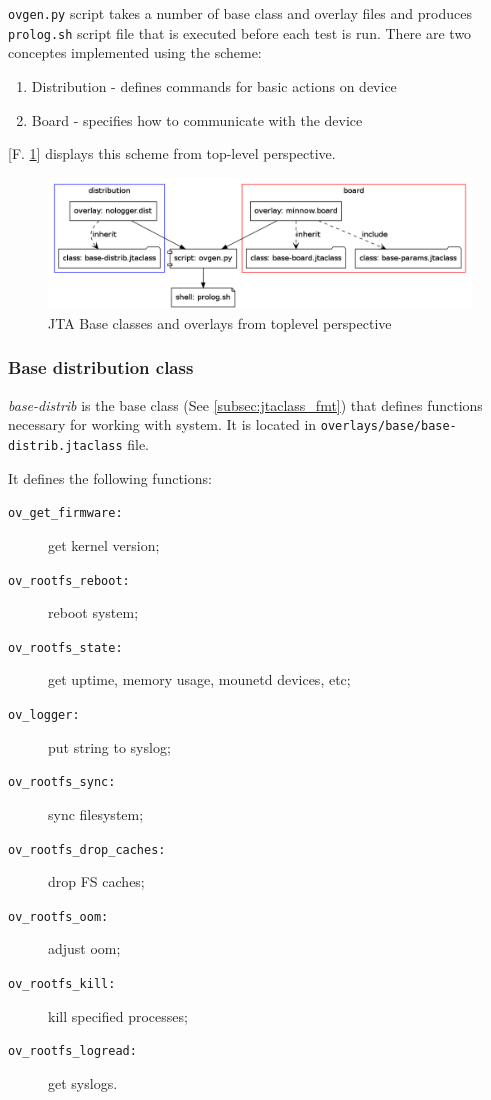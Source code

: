 \texttt{ovgen.py} script takes a number of base class and overlay files and produces \texttt{prolog.sh} script file that
is executed before each test is run.
There are two conceptes implemented using the scheme:
\begin{enumerate}
\item Distribution - defines commands for basic actions on device
\item Board - specifies how to communicate with the device
\end{enumerate}
[F. \ref{fig:base_ovs_toplevel}] displays this scheme from top-level perspective.
\begin{figure}[H]
  \includegraphics*[width=16cm]{overlays_toplevel.png}
  \caption{JTA Base classes and overlays from toplevel perspective}
  \label{fig:base_ovs_toplevel}
\end{figure}

\subsubsection{Base distribution class}
\textit{base-distrib} is the base class (See \ref{subsec:jtaclass_fmt}) that defines functions necessary for working with system. It is located in \texttt{overlays/base/base-distrib.jtaclass} file.

It defines the following functions:

\begin{description}
\item[\texttt{ov\_get\_firmware:}] get kernel version;
\item[\texttt{ov\_rootfs\_reboot:}] reboot system;
\item[\texttt{ov\_rootfs\_state:}] get uptime, memory usage, mounetd devices, etc;
\item[\texttt{ov\_logger:}] put string to syslog;
\item[\texttt{ov\_rootfs\_sync:}] sync filesystem;
\item[\texttt{ov\_rootfs\_drop\_caches:}] drop FS caches;
\item[\texttt{ov\_rootfs\_oom:}] adjust oom;
\item[\texttt{ov\_rootfs\_kill:}] kill specified processes;
\item[\texttt{ov\_rootfs\_logread:}] get syslogs.
\end{description}

